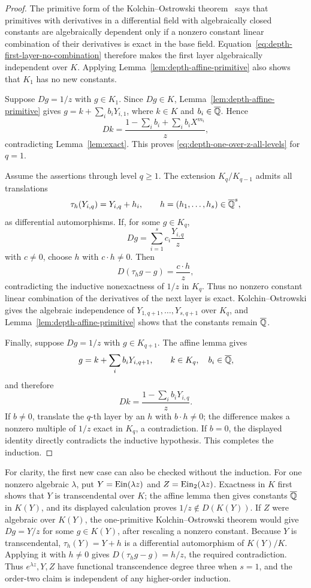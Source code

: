 \begin{proof}
The primitive form of the Kolchin--Ostrowski theorem~\cite{Kolchin} says that primitives
with derivatives in a differential field with algebraically closed
constants are algebraically dependent only if a nonzero constant linear
combination of their derivatives is exact in the base field.
Equation~\eqref{eq:depth-first-layer-no-combination} therefore makes the
first layer algebraically independent over \(K\).  Applying
Lemma~\ref{lem:depth-affine-primitive} also shows that \(K_1\) has no new
constants.

Suppose \(Dg=1/z\) with \(g\in K_1\).  Since \(Dg\in K\),
Lemma~\ref{lem:depth-affine-primitive} gives
\(g=k+\sum_i b_iY_{i,1}\), where \(k\in K\) and
\(b_i\in\overline{\mathbb Q}\).  Hence
\[
 Dk=\frac{1-\sum_i b_i+\sum_i b_iX^{m_i}}z,
\]
contradicting Lemma~\ref{lem:exact}.  This proves
\eqref{eq:depth-one-over-z-all-levels} for \(q=1\).

Assume the assertions through level \(q\geq1\).  The extension
\(K_q/K_{q-1}\) admits all translations
\[
 \tau_h(Y_{i,q})=Y_{i,q}+h_i,\qquad
 h=(h_1,\ldots,h_s)\in\overline{\mathbb Q}^s,
\]
as differential automorphisms.  If, for some \(g\in K_q\),
\[
 Dg=\sum_{i=1}^s c_i\frac{Y_{i,q}}z
\]
with \(c\ne0\), choose \(h\) with \(c\mathbin{\cdot}h\ne0\).  Then
\[
 D(\tau_hg-g)=\frac{c\mathbin{\cdot}h}{z},
\]
contradicting the inductive nonexactness of \(1/z\) in \(K_q\).
Thus no nonzero constant linear combination of the derivatives of the
next layer is exact.  Kolchin--Ostrowski gives the algebraic independence
of \(Y_{1,q+1},\ldots,Y_{s,q+1}\) over \(K_q\), and
Lemma~\ref{lem:depth-affine-primitive} shows that the constants remain
\(\overline{\mathbb Q}\).

Finally, suppose \(Dg=1/z\) with \(g\in K_{q+1}\).  The affine lemma gives
\[
 g=k+\sum_i b_iY_{i,q+1},\qquad
 k\in K_q,\quad b_i\in\overline{\mathbb Q},
\]
and therefore
\[
 Dk=\frac{1-\sum_i b_iY_{i,q}}z.
\]
If \(b\ne0\), translate the \(q\)-th layer by an \(h\) with
\(b\mathbin{\cdot}h\ne0\); the difference makes a nonzero multiple of
\(1/z\) exact in \(K_q\), a contradiction.  If \(b=0\), the displayed
identity directly contradicts the inductive hypothesis.  This completes
the induction.
\end{proof}

For clarity, the first new case can also be checked without the induction.
For one nonzero algebraic \(\lambda\), put
\(Y=\operatorname{Ein}(\lambda z)\) and
\(Z=\operatorname{Ein}_{2}(\lambda z)\).  Exactness in \(K\) first shows that
\(Y\) is transcendental over \(K\); the affine lemma then gives constants
\(\overline{\mathbb Q}\) in \(K(Y)\), and its displayed calculation proves
\(1/z\notin D(K(Y))\).  If \(Z\) were algebraic over \(K(Y)\), the
one-primitive Kolchin--Ostrowski theorem would give
\(Dg=Y/z\) for some \(g\in K(Y)\), after rescaling a nonzero constant.
Because \(Y\) is transcendental, \(\tau_h(Y)=Y+h\) is a differential
automorphism of \(K(Y)/K\).  Applying it with \(h\ne0\) gives
\(D(\tau_hg-g)=h/z\), the required contradiction.  Thus
\(e^{\lambda z},Y,Z\) have functional transcendence degree three when
\(s=1\), and the order-two claim is independent of any higher-order
induction.

